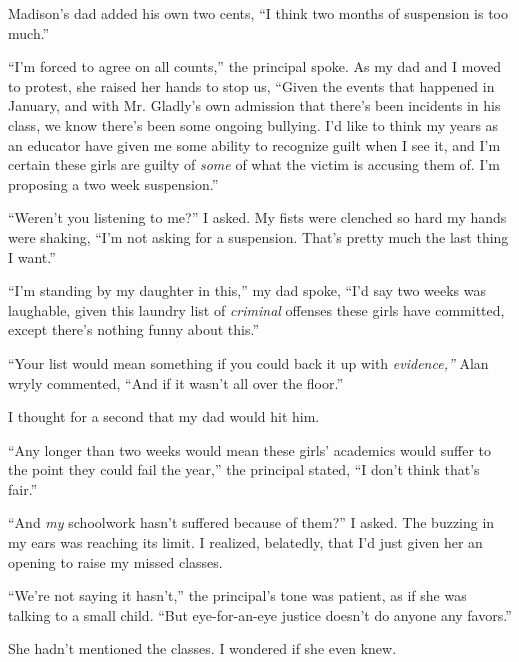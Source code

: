 Madison's dad added his own two cents, ``I think two months of suspension is too much.''



``I'm forced to agree on all counts,'' the principal spoke.  As my dad and I moved to protest, she raised her hands to stop us, ``Given the events that happened in January, and with Mr. Gladly's own admission that there's been incidents in his class, we know there's been some ongoing bullying.  I'd like to think my years as an educator have given me some ability to recognize guilt when I see it, and I'm certain these girls are guilty of \emph{some} of what the victim is accusing them of.  I'm proposing a two week suspension.''



``Weren't you listening to me?'' I asked.  My fists were clenched so hard my hands were shaking, ``I'm not asking for a suspension.  That's pretty much the last thing I want.''



``I'm standing by my daughter in this,'' my dad spoke, ``I'd say two weeks was laughable, given this laundry list of \emph{criminal} offenses these girls have committed, except there's nothing funny about this.''



``Your list would mean something if you could back it up with \emph{evidence,'' }Alan wryly commented, ``And if it wasn't all over the floor.''



I thought for a second that my dad would hit him.



``Any longer than two weeks would mean these girls' academics would suffer to the point they could fail the year,'' the principal stated, ``I don't think that's fair.''



``And \emph{my} schoolwork hasn't suffered because of them?'' I asked.  The buzzing in my ears was reaching its limit.  I realized, belatedly, that I'd just given her an opening to raise my missed classes.



``We're not saying it hasn't,'' the principal's tone was patient, as if she was talking to a small child.  ``But eye-for-an-eye justice doesn't do anyone any favors.''



She hadn't mentioned the classes.  I wondered if she even knew.



